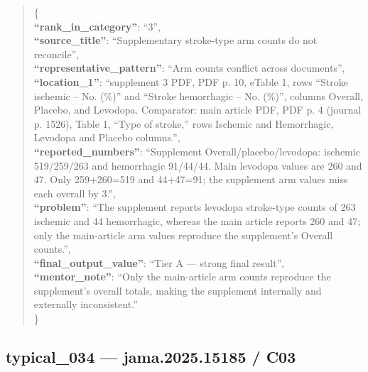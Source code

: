 \documentclass[
  letterpaper,
  9pt]{extreport}
\begin{document}
\begin{quote}
\{\\
\textbf{``rank\_in\_category''}: ``3'',\\
\textbf{``source\_title''}: ``Supplementary stroke-type arm counts do
not reconcile'',\\
\textbf{``representative\_pattern''}: ``Arm counts conflict across
documents'',\\
\textbf{``location\_1''}: ``supplement 3 PDF, PDF p. 10, eTable 1, rows
``Stroke ischemic -- No. (\%)'' and ``Stroke hemorrhagic -- No. (\%)'',
columns Overall, Placebo, and Levodopa. Comparator: main article PDF,
PDF p. 4 (journal p. 1526), Table 1, ``Type of stroke,'' rows Ischemic
and Hemorrhagic, Levodopa and Placebo columns.'',\\
\textbf{``reported\_numbers''}: ``Supplement Overall/placebo/levodopa:
ischemic 519/259/263 and hemorrhagic 91/44/44. Main levodopa values are
260 and 47. Only 259+260=519 and 44+47=91; the supplement arm values
miss each overall by 3.'',\\
\textbf{``problem''}: ``The supplement reports levodopa stroke-type
counts of 263 ischemic and 44 hemorrhagic, whereas the main article
reports 260 and 47; only the main-article arm values reproduce the
supplement's Overall counts.'',\\
\textbf{``final\_output\_value''}: ``Tier A --- strong final result'',\\
\textbf{``mentor\_note''}: ``Only the main-article arm counts reproduce
the supplement's overall totals, making the supplement internally and
externally inconsistent.''\\
\}
\end{quote}

\hypertarget{typical_034--jama202515185--c03}{%
\subsection{typical\_034 --- jama.2025.15185 /
C03}\label{typical_034--jama202515185--c03}}
\end{document}
